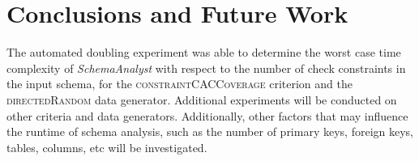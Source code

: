\section{Conclusions and Future Work}
The automated doubling experiment was able to determine the worst case
time complexity of \textit{SchemaAnalyst} with respect to the number of
check constraints in the input schema, for the
\textsc{constraintCACCoverage} criterion and the
\textsc{directedRandom} data generator.  Additional experiments will be
conducted on other criteria and data generators. Additionally, other factors 
that may influence the runtime of schema analysis,
such as the number of primary keys, foreign keys, tables, columns, etc
will be investigated.
